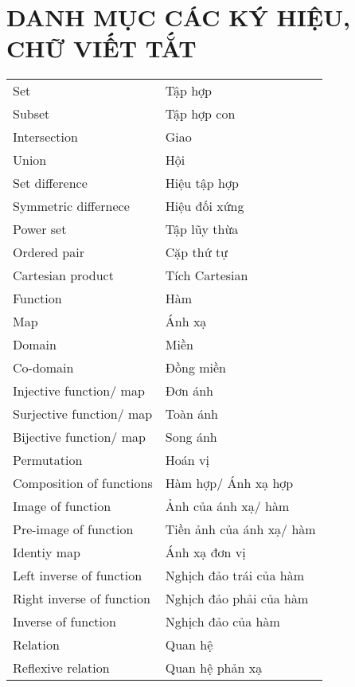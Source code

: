 \chapter*{DANH MỤC CÁC KÝ HIỆU, CHỮ VIẾT TẮT}
\begin{center}
	\begin{longtable}{ l  l }
            Set & Tập hợp \\
            Subset & Tập hợp con \\
            Intersection & Giao \\
            Union & Hội \\
            Set difference & Hiệu tập hợp \\
            Symmetric differnece & Hiệu đối xứng \\ 
            Power set  & Tập lũy thừa \\
            Ordered pair & Cặp thứ tự \\
            Cartesian product & Tích Cartesian \\
            Function & Hàm \\ 
            Map & Ánh xạ \\
            Domain & Miền \\ 
            Co-domain & Đồng miền \\ 
            Injective function/ map & Đơn ánh \\ 
            Surjective function/ map & Toàn ánh \\ 
            Bijective function/ map & Song ánh \\
            Permutation & Hoán vị \\ 
            Composition of functions & Hàm hợp/ Ánh xạ hợp \\ 
            Image of function & Ảnh của ánh xạ/ hàm \\ 
            Pre-image of function & Tiền ảnh của ánh xạ/ hàm \\ 
            Identiy map & Ánh xạ đơn vị \\
            Left inverse of function & Nghịch đảo trái của hàm \\ 
            Right inverse of function & Nghịch đảo phải của hàm \\ 
            Inverse of function & Nghịch đảo của hàm \\ 
            Relation & Quan hệ \\ 
            Reflexive relation & Quan hệ phản xạ \\ 

\end{longtable}
\end{center}
